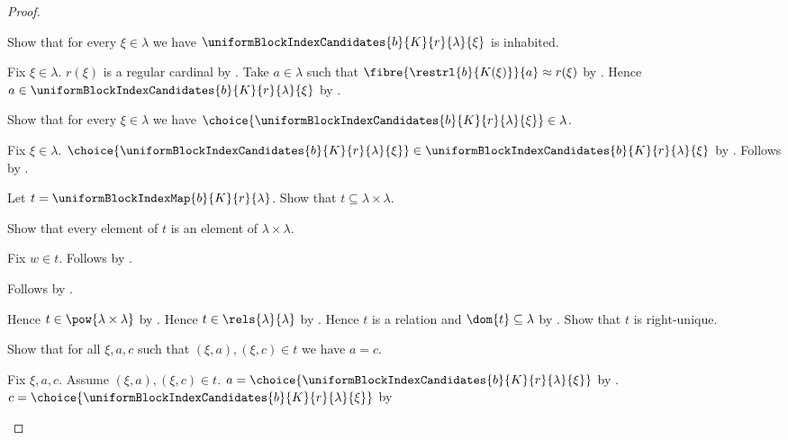 \begin{proof}
\begin{subproof}
    \end{subproof}
    Show that for every $\xi\in\lambda$ we have
        $\uniformBlockIndexCandidates{b}{K}{r}{\lambda}{\xi}$ is inhabited.
    \begin{subproof}
        Fix $\xi\in\lambda$.
        $r(\xi)$ is a regular cardinal by
            .
        Take $a\in\lambda$ such that
            $\fibre{\restrl{b}{K(\xi)}}{a}\approx r(\xi)$ by
            .
        Hence $a\in\uniformBlockIndexCandidates
            {b}{K}{r}{\lambda}{\xi}$ by
            .
    \end{subproof}
    Show that for every $\xi\in\lambda$ we have
        $\choice{\uniformBlockIndexCandidates
            {b}{K}{r}{\lambda}{\xi}}\in\lambda$.
    \begin{subproof}
        Fix $\xi\in\lambda$.
        $\choice{\uniformBlockIndexCandidates{b}{K}{r}{\lambda}{\xi}}
            \in\uniformBlockIndexCandidates{b}{K}{r}{\lambda}{\xi}$ by
            .
        Follows by .
    \end{subproof}
    Let $t=\uniformBlockIndexMap{b}{K}{r}{\lambda}$.
    Show that $t\subseteq\lambda\times\lambda$.
    \begin{subproof}
        Show that every element of $t$ is an element of
            $\lambda\times\lambda$.
        \begin{subproof}
            Fix $w\in t$.
            Follows by .
        \end{subproof}
        Follows by .
    \end{subproof}
    Hence $t\in\pow{\lambda\times\lambda}$ by .
    Hence $t\in\rels{\lambda}{\lambda}$ by .
    Hence $t$ is a relation and $\dom{t}\subseteq\lambda$ by
        .
    Show that $t$ is right-unique.
    \begin{subproof}
        Show that for all $\xi,a,c$ such that $(\xi,a),(\xi,c)\in t$
            we have $a=c$.
        \begin{subproof}
            Fix $\xi,a,c$.
            Assume $(\xi,a),(\xi,c)\in t$.
            $a=\choice{\uniformBlockIndexCandidates
                {b}{K}{r}{\lambda}{\xi}}$ by
                .
            $c=\choice{\uniformBlockIndexCandidates
                {b}{K}{r}{\lambda}{\xi}}$ by

\end{subproof}
\end{subproof}
\end{proof}
